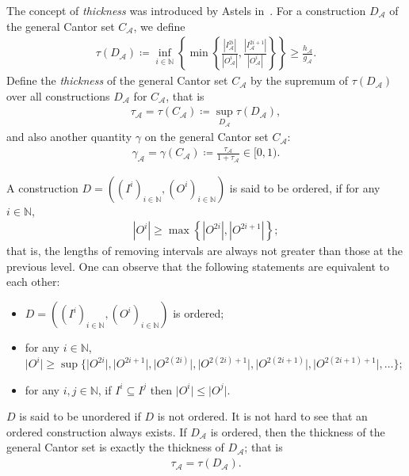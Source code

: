 \documentclass{ws-ijnt}
\begin{document}
	The concept of \emph{thickness} was introduced by Astels in~\cite{astels2000}. For a construction $D_{\mathcal{A}}$ of the general Cantor set $C_{\mathcal{A}}$, we define
	\begin{align*}
		\tau(D_{\mathcal{A}})
		\coloneqq \inf_{i\in\mathbb{N}}{\left\{ \min \left\{
			\frac{\left\lvert I_{\mathcal{A}}^{2i}\right\rvert}{\left\lvert O_{\mathcal{A}}^{i}\right\rvert},
			\frac{\left\lvert I_{\mathcal{A}}^{2i+1}\right\rvert}{\left\lvert O_{\mathcal{A}}^{i}\right\rvert}\right\}\right\}}
		\geq\frac{h_{\mathcal{A}}}{g_{\mathcal{A}}}
		.
	\end{align*}
	Define the \emph{thickness} of the general Cantor set $C_{\mathcal{A}}$ by the supremum of $\tau(D_{\mathcal{A}})$ over all constructions $D_{\mathcal{A}}$ for $C_{\mathcal{A}}$, that is
	\begin{align*}
		\tau_{\mathcal{A}}
		=\tau(C_{\mathcal{A}})
		\coloneqq \sup_{D_{\mathcal{A}}}{\tau(D_{\mathcal{A}})},
	\end{align*}
	and also another quantity $\gamma$ on the general Cantor set $C_{\mathcal{A}}$:
	\begin{align*}
		\gamma_{\mathcal{A}}
		=\gamma(C_{\mathcal{A}})
		\coloneqq\frac{\tau_{\mathcal{A}}}{1+\tau_{\mathcal{A}}}\in[0,1).
	\end{align*}
	
	A construction $D=((I^i)_{i\in\mathbb{N}},(O^i)_{i\in\mathbb{N}})$ is said to be ordered, if for any $i\in\mathbb{N}$,
	\begin{align*}
		\left\lvert{O^i}\right\rvert
		\geq\max{\left\{\left\lvert{O^{2i}}\right\rvert,\left\lvert{O^{2i+1}}\right\rvert\right\}};
	\end{align*}
	that is, the lengths of removing intervals are always not greater than those at the previous level. One can observe that the following statements are equivalent to each other:
	\begin{itemize}
		\item $D=((I^i)_{i\in\mathbb{N}},(O^i)_{i\in\mathbb{N}})$ is ordered;
		\item for any $i\in\mathbb{N}$, $\lvert O^{i}\rvert \geq \sup\{\lvert O^{2i}\rvert, \lvert O^{2i+1}\rvert, \lvert O^{2(2i)}\rvert, \lvert O^{2(2i)+1}\rvert, \lvert O^{2(2i+1)}\rvert, \lvert O^{2(2i+1)+1}\rvert, \dots  \}$;
		\item for any $i,j\in\mathbb{N}$, if $I^i\subseteq I^j$ then $\lvert O^i\rvert\leq\lvert O^j\rvert$.
	\end{itemize}
	$D$ is said to be unordered if $D$ is not ordered. It is not hard to see that an ordered construction always exists. If $D_{\mathcal{A}}$ is ordered, then the thickness of the general Cantor set is exactly the thickness of $D_{\mathcal{A}}$; that is
	\begin{align}\label{thickness}
		\tau_{\mathcal{A}}=\tau(D_{\mathcal{A}})
		.
	\end{align}
	
\end{document}
